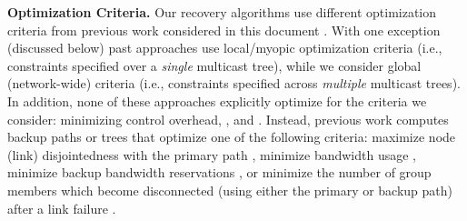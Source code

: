 {\bf Optimization Criteria.}
Our recovery algorithms use different optimization criteria from previous work considered in this document \cite{Cui04,Fei01,Kodialam02,Lau05,Li06,Luebben09,Medard99,Pointurier02,Wu97}. 
With one exception \cite{Li06} (discussed below) past approaches use local/myopic optimization criteria (i.e., constraints specified over a \emph{single} multicast tree),
while we consider global (network-wide) criteria (i.e., constraints specified across \emph{multiple} multicast trees).  In addition, none of these approaches explicitly optimize
for the criteria we consider: minimizing control overhead, , and 
.
Instead, previous work computes backup paths or trees that optimize one of the following criteria: maximize node (link) disjointedness with the primary 
path \cite{Cui04,Fei01,Luebben09,Medard99}, minimize bandwidth usage \cite{Wu97}, minimize backup bandwidth reservations \cite{Kodialam02,Lau05,Li06}, or minimize the number of group members which become disconnected (using either the primary or backup path) after a link failure \cite{Pointurier02}.







